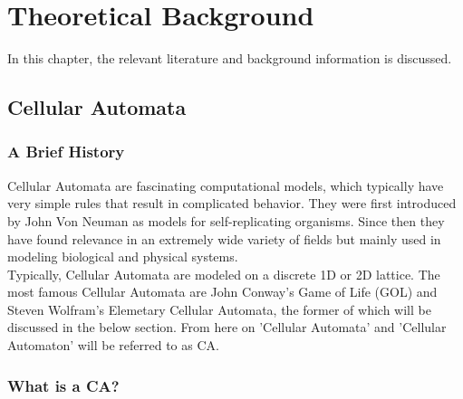 
\chapter{Theoretical Background} %
\label{Chapter2} %
In this chapter, the relevant literature and background information is discussed.  
\section{Cellular Automata}
\subsection{A Brief History}

Cellular Automata are fascinating computational models, which typically have very simple rules that result in complicated behavior. They were first introduced by John Von Neuman \cite{sarkar2000brief} as models for self-replicating organisms. Since then they have found relevance in an extremely wide variety of fields but mainly used in modeling biological and physical systems. \\
Typically, Cellular Automata are modeled on a discrete 1D or 2D lattice. The most famous Cellular Automata are John Conway's Game of Life (GOL) and Steven Wolfram's Elemetary Cellular Automata, the former of which will be discussed in the below section.
From here on 'Cellular Automata' and 'Cellular Automaton' will be referred to as CA.
\subsection{What is a CA?}


